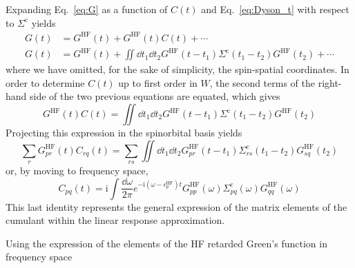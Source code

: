 \documentclass[aip,jcp,reprint,noshowkeys,superscriptaddress]{revtex4-2}
\newcommand{\HF}{\text{HF}}
\newcommand{\co}{\text{c}}
\newcommand{\eps}{\epsilon}
\newcommand{\Sig}{\Sigma}
\newcommand{\ii}{\mathrm{i}}
\begin{document}
Expanding Eq.~\eqref{eq:G} as a function of $C(t)$ and Eq.~\eqref{eq:Dyson_t} with respect to $\Sig^\co$ yields
\begin{subequations}
\begin{align} 
	G(t) & = G^\HF(t) + G^\HF(t) C(t) + \cdots
	\\
	G(t) & = G^\HF(t) + \iint \dd{t_1} \dd{t_2} G^\HF(t-t_1) \Sig^\co(t_1-t_2) G^\HF(t_2)  + \cdots	
\end{align}
\end{subequations}
where we have omitted, for the sake of simplicity, the spin-spatial coordinates.
In order to determine $C(t)$ up to first order in $W$, the second terms of the right-hand side of the two previous equations are equated, which gives
\begin{equation}
	G^\HF(t) C(t) = \iint \dd{t_1} \dd{t_2} G^\HF(t-t_1) \Sig^\co(t_1-t_2) G^\HF(t_2)
\end{equation}
Projecting this expression in the spinorbital basis yields
\begin{equation}
	\sum_r G_{pr}^\HF(t) C_{rq}(t) = \sum_{rs} \iint \dd{t_1} \dd{t_2} G_{pr}^\HF(t-t_1) \Sig_{rs}^\co(t_1 - t_2) G_{sq}^\HF(t_2)
\end{equation}
or, by moving to frequency space,
\begin{equation}
	C_{pq}(t) = \ii \int \frac{\dd{\omega}}{2\pi} e^{-\ii(\omega-\eps_p^\HF)t} 
		G_{pp}^\HF(\omega) \Sig_{pq}^\co(\omega) G_{qq}^\HF(\omega)
\end{equation}
This last identity represents the general expression of the matrix elements of the cumulant within the linear response approximation. 

Using the expression of the elements of the HF retarded Green's function in frequency space
\end{document}
